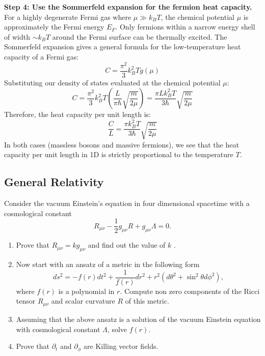 \begin{solution}
\textbf{Step 4: Use the Sommerfeld expansion for the fermion heat capacity.}
For a highly degenerate Fermi gas where $\mu \gg k_B T$, the chemical potential $\mu$ is approximately the Fermi energy $E_F$. Only fermions within a narrow energy shell of width $\sim k_B T$ around the Fermi surface can be thermally excited.
The Sommerfeld expansion gives a general formula for the low-temperature heat capacity of a Fermi gas:
\begin{equation*}
    C = \frac{\pi^2}{3} k_B^2 T g(\mu)
\end{equation*}
Substituting our density of states evaluated at the chemical potential $\mu$:
\begin{equation*}
    C = \frac{\pi^2}{3} k_B^2 T \left( \frac{L}{\pi \hbar} \sqrt{\frac{m}{2\mu}} \right) = \frac{\pi L k_B^2 T}{3\hbar} \sqrt{\frac{m}{2\mu}}
\end{equation*}
Therefore, the heat capacity per unit length is:
\begin{equation*}
    \frac{C}{L} = \frac{\pi k_B^2 T}{3\hbar} \sqrt{\frac{m}{2\mu}}
\end{equation*}
In both cases (massless bosons and massive fermions), we see that the heat capacity per unit length in 1D is strictly proportional to the temperature $T$.
\end{solution}

\subsection{General Relativity}

\begin{exercise}
\label{physics:2023:5}
Consider the vacuum Einstein's equation in four dimensional spacetime with a cosmological constant
\begin{equation}
    R_{\mu\nu} - \frac{1}{2} g_{\mu\nu} R + g_{\mu\nu} \Lambda = 0. \label{eq:2023:5:9}
\end{equation}

\begin{enumerate}[label=(\alph*)]
    \item Prove that $R _ { \mu \nu } = k g _ { \mu \nu }$ and find out the value of $k$ .
    \item Now start with an ansatz of a metric in the following form
    \begin{equation}
        ds^2 = -f(r) dt^2 + \frac{1}{f(r)} dr^2 + r^2 (d\theta^2 + \sin^2\theta d\phi^2), \label{eq:2023:5:10}
    \end{equation}
    where $f(r)$ is a polynomial in $r$. Compute non zero components of the Ricci tensor $R_{\mu\nu}$ and scalar curvature $R$ of this metric.
    \item Assuming that the above ansatz is a solution of the vacuum Einstein equation with cosmological constant $\Lambda$, solve $f(r)$.
    \item Prove that $\partial _ { t }$ and $\partial _ { \phi }$ are Killing vector fields.
\end{enumerate}
\end{exercise}

